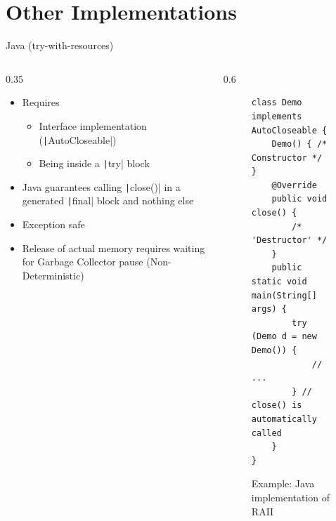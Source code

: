 \section{Other Implementations}

\begin{frame}[fragile]{Java (try-with-resources)}
	\begin{columns}[T,onlytextwidth]
		\begin{column}{0.35\textwidth}
			\begin{itemize}
				\item Requires
				      \begin{itemize}
					      \item Interface implementation (\texttt|AutoCloseable|)
					      \item Being inside a \texttt|try| block
				      \end{itemize}
				\item Java guarantees calling \texttt|close()| in a generated \texttt|final| block and nothing else
				\item Exception safe
				\item Release of actual memory requires waiting for Garbage Collector pause (Non-Deterministic)
			\end{itemize}
		\end{column}
		\begin{column}{0.6\textwidth}
			\begin{figure}
				\centering
				\begin{verbatim}
class Demo implements AutoCloseable {
    Demo() { /* Constructor */ }
    @Override
    public void close() {
        /* 'Destructor' */
    }
    public static void main(String[] args) {
        try (Demo d = new Demo()) {
            // ...
        } // close() is automatically called
    }
}
                \end{verbatim}
				\caption{Example: Java implementation of RAII}
			\end{figure}
		\end{column}
	\end{columns}
\end{frame}

